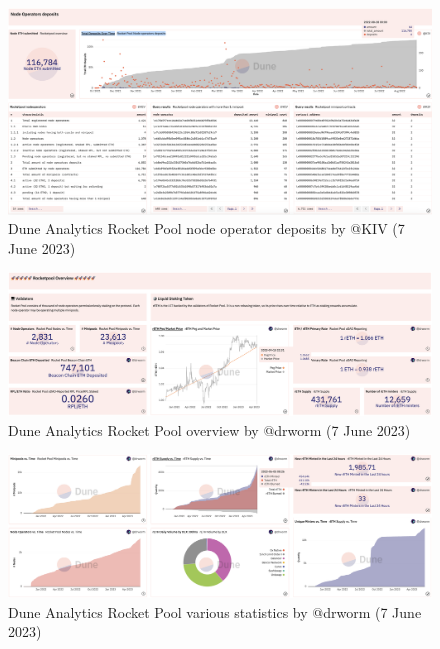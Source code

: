 \documentclass[UTF8]{article}
\begin{document}
\begin{figure}[htbp]
\begin{center}
\includegraphics[width=\linewidth]{images/dunerocket3}
\caption{Dune Analytics Rocket Pool node operator deposits by @KIV  (7 June 2023)}
\label{fig:dunerocket3}
\end{center}
\end{figure}

\begin{figure}[htbp]
\begin{center}
\includegraphics[width=\linewidth]{images/rocketdrworm1}
\caption{Dune Analytics Rocket Pool overview by @drworm  (7 June 2023)}
\label{fig:rocketdrworm1}
\end{center}
\end{figure}

\begin{figure}[htbp]
\begin{center}
\includegraphics[width=\linewidth]{images/rocketdrworm2}
\caption{Dune Analytics Rocket Pool various statistics by @drworm  (7 June 2023)}
\label{fig:rocketdrworm2}
\end{center}
\end{figure}
\end{document}
